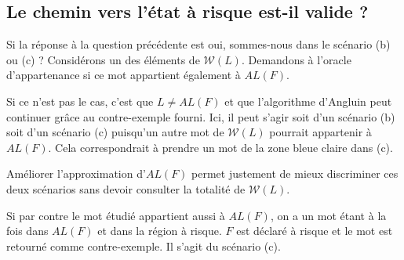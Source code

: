 \subsection{Le chemin vers l'état à risque est-il valide ?}

Si la réponse à la question précédente est oui, sommes-nous dans le scénario (b) ou (c) ?
Considérons un des éléments de $\mathcal{W}(L)$. Demandons à l'oracle d'appartenance si ce mot appartient également à $AL(F)$.

Si ce n'est pas le cas, c'est que $L\neq AL(F)$ et que l'algorithme d'Angluin peut continuer grâce au contre-exemple fourni. Ici, il peut s'agir soit d'un scénario (b) soit d'un scénario (c) puisqu'un autre mot de $\mathcal{W}(L)$ pourrait appartenir à $AL(F)$. Cela correspondrait à prendre un mot de la zone bleue claire dans (c).

Améliorer l'approximation d'$AL(F)$ permet justement de mieux discriminer ces deux scénarios sans devoir consulter la totalité de $\mathcal{W}(L)$.

Si par contre le mot étudié appartient aussi à $AL(F)$, on a un mot étant à la fois dans $AL(F)$ et dans la région à risque. $F$ est déclaré à risque et le mot est retourné comme contre-exemple. Il s'agit du scénario (c).
